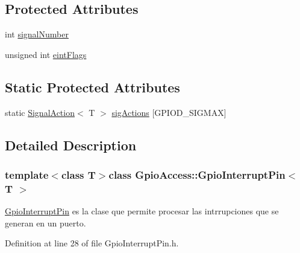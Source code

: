 \subsection*{\-Protected \-Attributes}
\begin{DoxyCompactItemize}
\item 
int \hyperlink{class_gpio_access_1_1_gpio_interrupt_pin_a1f41ac0250370704c82e2ef827ad55d0}{signal\-Number}
\item 
unsigned int \hyperlink{class_gpio_access_1_1_gpio_interrupt_pin_a60d94e09b68398546d0f8bca1d8f8662}{eint\-Flags}
\end{DoxyCompactItemize}
\subsection*{\-Static \-Protected \-Attributes}
\begin{DoxyCompactItemize}
\item 
static \hyperlink{struct_gpio_access_1_1_signal_action}{\-Signal\-Action}$<$ \-T $>$ \hyperlink{class_gpio_access_1_1_gpio_interrupt_pin_a71835f78bf46796ca311b4357bee2d68}{sig\-Actions} \mbox{[}\-G\-P\-I\-O\-D\-\_\-\-S\-I\-G\-M\-A\-X\mbox{]}
\end{DoxyCompactItemize}


\subsection{\-Detailed \-Description}
\subsubsection*{template$<$class T$>$class Gpio\-Access\-::\-Gpio\-Interrupt\-Pin$<$ T $>$}

\hyperlink{class_gpio_access_1_1_gpio_interrupt_pin}{\-Gpio\-Interrupt\-Pin} es la clase que permite procesar las intrrupciones que se generan en un puerto. 

\-Definition at line 28 of file \-Gpio\-Interrupt\-Pin.\-h.



